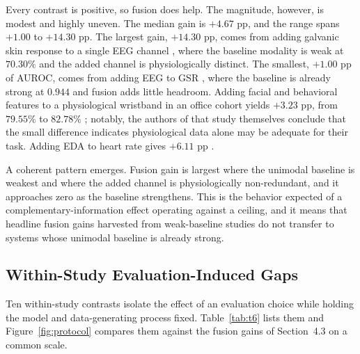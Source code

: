 \documentclass[11pt,a4paper]{article}
\begin{document}
Every contrast is positive, so fusion does help. The magnitude, however, is modest and highly
uneven. The median gain is $+4.67$ pp, and the range spans $+1.00$ to $+14.30$ pp. The
largest gain, $+14.30$ pp, comes from adding galvanic skin response to a single EEG channel
\cite{r75}, where the baseline modality is weak at $70.30\%$ and the added channel is
physiologically distinct. The smallest, $+1.00$ pp of AUROC, comes from adding EEG to GSR
\cite{r37}, where the baseline is already strong at $0.944$ and fusion adds little headroom.
Adding facial and behavioral features to a physiological wristband in an office cohort
yields $+3.23$ pp, from $79.55\%$ to $82.78\%$ \cite{r26}; notably, the authors of that study
themselves conclude that the small difference indicates physiological data alone may be
adequate for their task. Adding EDA to heart rate gives $+6.11$ pp \cite{r12}.

A coherent pattern emerges. Fusion gain is largest where the unimodal baseline is weakest and
where the added channel is physiologically non-redundant, and it approaches zero as the
baseline strengthens. This is the behavior expected of a complementary-information effect
operating against a ceiling, and it means that headline fusion gains harvested from
weak-baseline studies do not transfer to systems whose unimodal baseline is already strong.

\subsection{Within-Study Evaluation-Induced Gaps}
Ten within-study contrasts isolate the effect of an evaluation choice while holding the model
and data-generating process fixed. Table~\ref{tab:t6} lists them and
Figure~\ref{fig:protocol} compares them against the fusion gains of Section~4.3 on a common
scale.
\end{document}
